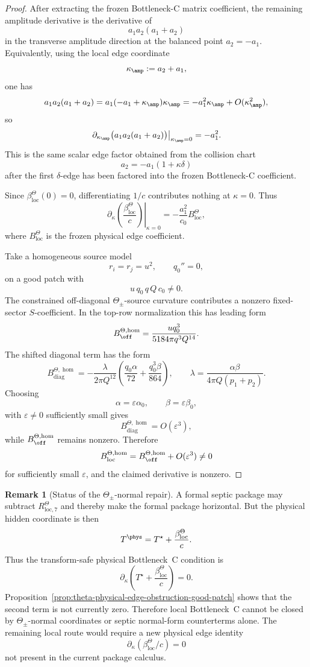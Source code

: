 \documentclass[11pt,a4paper]{amsart}
\theoremstyle{plain}
\theoremstyle{definition}
\newtheorem{remark}[theorem]{Remark}
\newcommand{\loc}{\mathrm{loc}}
\newcommand{\diag}{\operatorname{diag}}
\begin{document}
\begin{proof}
After extracting the frozen Bottleneck-C matrix coefficient, the remaining
amplitude derivative is the derivative of
\[
a_1a_2(a_1+a_2)
\]
in the transverse amplitude direction at the balanced point \(a_2=-a_1\).
Equivalently, using the local edge coordinate
\[
\kappa_{\amp}:=a_2+a_1,
\]
one has
\[
a_1a_2(a_1+a_2)
=
a_1(-a_1+\kappa_{\amp})\kappa_{\amp}
=
-a_1^2\kappa_{\amp}+O(\kappa_{\amp}^2),
\]
so
\[
\left.
\partial_{\kappa_{\amp}}
\bigl(a_1a_2(a_1+a_2)\bigr)
\right|_{\kappa_{\amp}=0}
=
-a_1^2.
\]
This is the same scalar edge factor obtained from the collision chart
\[
a_2=-a_1(1+\kappa\delta)
\]
after the first \(\delta\)-edge has been factored into the frozen
Bottleneck-C coefficient.

Since \(\beta_{\loc}^{\Theta}(0)=0\), differentiating \(1/c\) contributes
nothing at \(\kappa=0\).  Thus
\[
\left.
\partial_\kappa
\left(
\frac{\beta_{\loc}^{\Theta}}{c}
\right)
\right|_{\kappa=0}
=
-\frac{a_1^2}{c_0}B_{\loc}^{\Theta},
\]
where \(B_{\loc}^{\Theta}\) is the frozen physical edge coefficient.

Take a homogeneous source model
\[
r_i=r_j=u^2,
\qquad
q_0''=0,
\]
on a good patch with
\[
u\,q_0\,q\,Q\,c_0\ne0.
\]
The constrained off-diagonal \(\Theta_\pm\)-source curvature contributes a
nonzero fixed-sector \(S\)-coefficient.  In the top-row normalization this
has leading form
\[
B_{\off}^{\Theta,\hom}
=
\frac{u q_0^3}{5184\pi q^3Q^{14}}.
\]
The shifted diagonal term has the form
\[
B_{\diag}^{\Theta,\hom}
=
-\frac{\lambda}{2\pi Q^{12}}
\left(
\frac{q_0\alpha}{72}
+
\frac{q_0^3\beta}{864}
\right),
\qquad
\lambda=
\frac{\alpha\beta}{4\pi Q(p_1+p_2)}.
\]
Choosing
\[
\alpha=\varepsilon\alpha_0,\qquad
\beta=\varepsilon\beta_0,
\]
with \(\varepsilon\ne0\) sufficiently small gives
\[
B_{\diag}^{\Theta,\hom}=O(\varepsilon^3),
\]
while \(B_{\off}^{\Theta,\hom}\) remains nonzero.  Therefore
\[
B_{\loc}^{\Theta,\hom}
=
B_{\off}^{\Theta,\hom}
+
O(\varepsilon^3)
\ne0
\]
for sufficiently small \(\varepsilon\), and the claimed derivative is nonzero.
\end{proof}

\begin{remark}[Status of the \(\Theta_\pm\)-normal repair]
\label{rem:status-theta-normal-repair}
A formal septic package may subtract \(R_{\loc,7}^{\Theta}\) and thereby make
the formal package horizontal.  But the physical hidden coordinate is then
\[
T^{\phys}
=
T^\star+\frac{\beta_{\loc}^{\Theta}}{c}.
\]
Thus the transform-safe physical Bottleneck~C condition is
\[
\partial_\kappa
\left(
T^\star+\frac{\beta_{\loc}^{\Theta}}{c}
\right)=0.
\]
Proposition~\ref{prop:theta-physical-edge-obstruction-good-patch} shows that
the second term is not currently zero.  Therefore local Bottleneck~C cannot be
closed by \(\Theta_\pm\)-normal coordinates or septic normal-form counterterms
alone.  The remaining local route would require a new physical edge identity
\[
\partial_\kappa(\beta_{\loc}^{\Theta}/c)=0
\]
not present in the current package calculus.
\end{remark}
\end{document}
